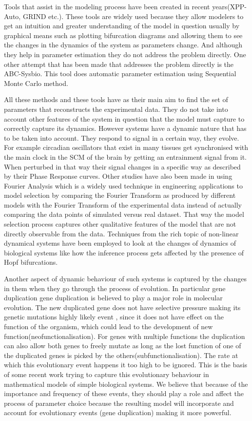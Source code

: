 \documentclass[12pt,a4paper,titlepage]{article}
\begin{document}
Tools that assist in the modeling process have been created in recent years(XPP-Auto, GRIND etc.). These tools are widely used because they allow modelers to get an intuition and greater understanding of the model in question usually by graphical means such as plotting bifurcation diagrams and allowing them to see the changes in the dynamics of the system as parameters change. And although they help in parameter estimation they do not address the problem directly. One other attempt that has been made that addresses the problem directly is the ABC-Sysbio\cite{liebe2010abcpy}. This tool does automatic parameter estimation using Sequential Monte Carlo method.

All these methods and these tools have as their main aim to find the set of parameters that reconstructs the experimental data. They do not take into account other features of the system in question that the model must capture to correctly capture its dynamics. However systems have a dynamic nature that has to be taken into account. They respond to signal in a certain way, they evolve. For example circadian oscillators that exist in many tissues get synchronised with the main clock in the SCM of the brain by getting an entrainment signal from it. When perturbed in that way their signal changes in a specific way as described by their Phase Response curves\cite{pfeuty2011robust}. Other studies have also been made in using Fourier Analysis which is a widely used technique in engineering applications to model selection by comparing the Fourier Transform as produced by different models with the Fourier Transform of the experimental data instead of actually comparing the data points of simulated versus real dataset\cite{konopka2010gene}. That way the model selection process captures other qualitative features of the model that are not directly observable from the data. Techniques from the rich topic of non-linear dynamical systems have been employed to look at the changes of dynamics of biological systems like how the inference process gets affected by the presence of Hopf bifurcations\cite{kirk2008parameter}.

 Another aspect of dynamic behaviour of such systems is captured by the changes in them when they go through the process of evolution.  In particular gene duplication gene duplication is believed to play a major role in molecular evolution. The new duplicated gene does not have selective pressure making its genetic mutations highly likely event , since it does not have effect on the function of the organism, which could lead to the development of new function(neofunctionalisation). For genes with multiple functions the duplication can also allow both genes to freely mutate as long as the lost function of one of the duplicated genes is picked by the others(subfunctionalisation). The rate at which this evolutionary event happens it too high to be ignored\cite{lipinski2011high}. This is the basis of some recent work trying to capture this evolutionary behaviour in mathematical models of simple biological systems\cite{das2012dupl}. We believe that because of the importance and frequency of these events, they should play a role and affect the process of parameter choice because the resulting model will incorporate and account for evolutionary events (gene duplication) making it more powerful.
\end{document}
